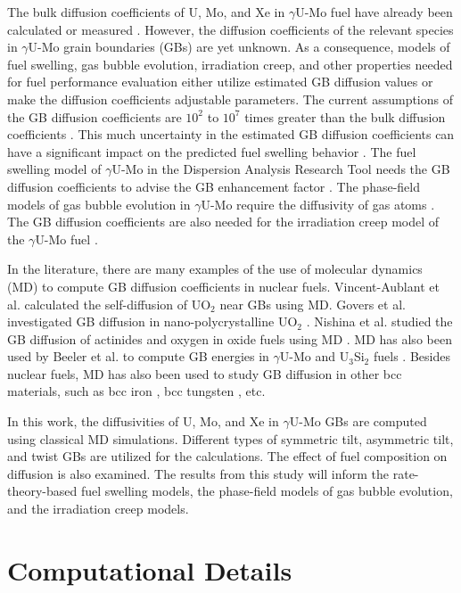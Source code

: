 \documentclass{elsarticle}
\begin{document}
The bulk diffusion coefficients of U, Mo, and Xe in $\gamma$U-Mo fuel have already been calculated \cite{smirnova2015, park2021} or measured \cite{huang2013}. However, the diffusion coefficients of the relevant species in $\gamma$U-Mo grain boundaries (GBs) are yet unknown. As a consequence, models of fuel swelling, gas bubble evolution, irradiation creep, and other properties needed for fuel performance evaluation either utilize estimated GB diffusion values or make the diffusion coefficients adjustable parameters. The current assumptions of the GB diffusion coefficients are $10^2$ to $10^7$ times greater than the bulk diffusion coefficients \cite{annualreport2021, ye2015}. This much uncertainty in the estimated GB diffusion coefficients can have a significant impact on the predicted fuel swelling behavior \cite{annualreport2022}. The fuel swelling model of $\gamma$U-Mo in the Dispersion Analysis Research Tool \cite{dart} needs the GB diffusion coefficients to advise the GB enhancement factor \cite{cui2015, annualreport2021}. The phase-field models of gas bubble evolution in $\gamma$U-Mo require the diffusivity of gas atoms \cite{hu2021, annualreport2021}. The GB diffusion coefficients are also needed for the irradiation creep model of the $\gamma$U-Mo fuel \cite{annualreport2022}.

In the literature, there are many examples of the use of molecular dynamics (MD) to compute GB diffusion coefficients in nuclear fuels. Vincent-Aublant et al. \cite{vincent2009} calculated the self-diffusion of UO$_2$ near GBs using MD. Govers et al. investigated GB diffusion in nano-polycrystalline UO$_2$ \cite{govers2013}. Nishina et al. studied the GB diffusion of actinides and oxygen in oxide fuels using MD \cite{nishina2011}. MD has also been used by Beeler et al. to compute GB energies in $\gamma$U-Mo and U$_3$Si$_2$ fuels \cite{beeler2018, beeler2019}. Besides nuclear fuels, MD has also been used to study GB diffusion in other bcc materials, such as bcc iron \cite{yang2018}, bcc tungsten \cite{fu2021}, etc.

In this work, the diffusivities of U, Mo, and Xe in $\gamma$U-Mo GBs are computed using classical MD simulations. Different types of symmetric tilt, asymmetric tilt, and twist GBs are utilized for the calculations. The effect of fuel composition on diffusion is also examined. The results from this study will inform the rate-theory-based fuel swelling models, the phase-field models of gas bubble evolution, and the irradiation creep models.


\section{Computational Details}
\end{document}
